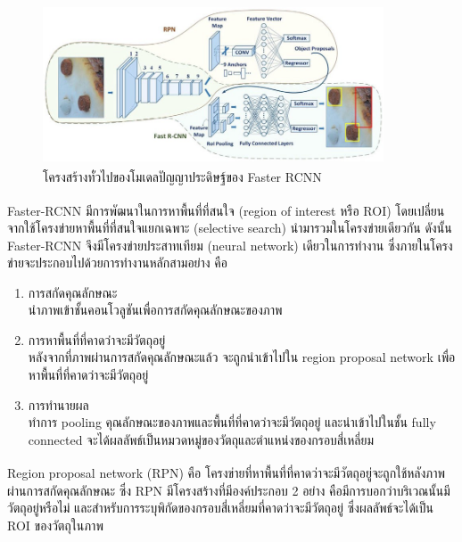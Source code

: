\begin{figure}[!ht]
    \centering
    \includegraphics[width=0.9\textwidth]{chapter2/images/faster_rcnn.png}
    \caption[โครงสร้างทั่วไปของโมเดลปัญญาประดิษฐ์ของ Faster RCNN]{โครงสร้างทั่วไปของโมเดลปัญญาประดิษฐ์ของ Faster RCNN\textsuperscript{\cite{faster_pic}}}
    \label{fig:faster_rcnn_architecture}
\end{figure}
\par Faster-RCNN\textsuperscript{\cite{faster}} มีการพัฒนาในการหาพื้นที่ที่สนใจ (region of interest หรือ ROI) โดยเปลี่ยนจากใช้โครงข่ายหาพื้นที่ที่สนใจแยกเฉพาะ (selective search) นำมารวมในโครงข่ายเดียวกัน 
ดังนั้น Faster-RCNN จึงมีโครงข่ายประสาทเทียม (neural network) เดียวในการทำงาน ซึ่งภายในโครงข่ายจะประกอบไปด้วยการทำงานหลักสามอย่าง คือ
\begin{enumerate}
	\setlength\itemsep{-0.25em}
	\item การสกัดคุณลักษณะ
	\\	นำภาพเข้าชั้นคอนโวลูชันเพื่อการสกัดคุณลักษณะของภาพ
	\item การหาพื้นที่ที่คาดว่าจะมีวัตถุอยู่
	\\	หลังจากที่ภาพผ่านการสกัดคุณลักษณะแล้ว จะถูกนำเข้าไปใน region proposal network เพื่อหาพื้นที่ที่คาดว่าจะมีวัตถุอยู่
	\item การทำนายผล
	\\	ทำการ pooling คุณลักษณะของภาพและพื้นที่ที่คาดว่าจะมีวัตถุอยู่ และนำเข้าไปในชั้น fully connected จะได้ผลลัพธ์เป็นหมวดหมู่ของวัตถุและตำแหน่งของกรอบสี่เหลี่ยม  
\end{enumerate}
\par Region proposal network (RPN)\textsuperscript{\cite{faster}} คือ โครงข่ายที่หาพื้นที่ที่คาดว่าจะมีวัตถุอยู่จะถูกใช้หลังภาพผ่านการสกัดคุณลักษณะ ซึ่ง RPN มีโครงสร้างที่มีองค์ประกอบ 2 อย่าง
คือมีการบอกว่าบริเวณนั้นมีวัตถุอยู่หรือไม่ และสำหรับการระบุพิกัดของกรอบสี่เหลี่ยมที่คาดว่าจะมีวัตถุอยู่ ซึ่งผลลัพธ์จะได้เป็น ROI ของวัตถุในภาพ 